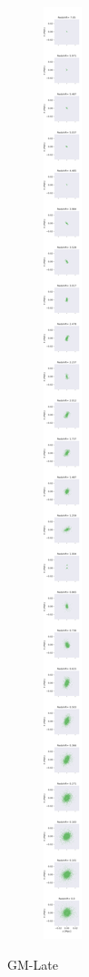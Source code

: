 \documentclass{article}
\begin{document}
\begin{figure}
\begin{subfigure} {.325\columnwidth}
		\end{subfigure}
			\hfill
		\begin{subfigure} {.325\columnwidth}
				\centering 
				\includegraphics[width=\columnwidth]{../../plots/coordinates_plotter/GM-Late_z-x_coordinates_evolution.png}
		\end{subfigure}
		
		\caption{GM-Late}
	\end{figure}
\end{document}
